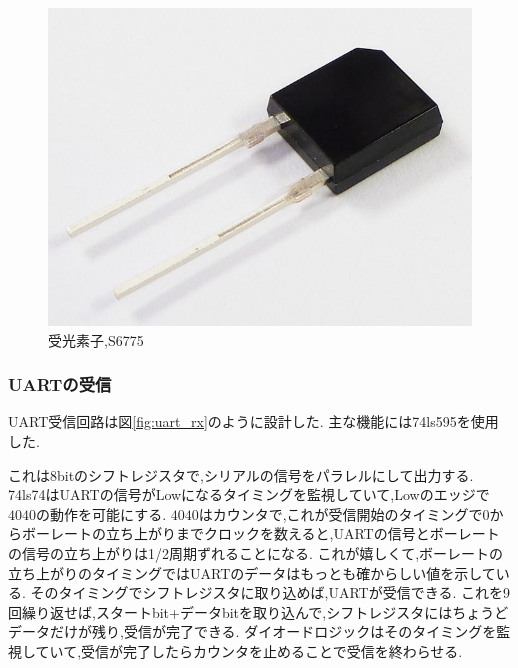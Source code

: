 \documentclass[a4paper,10pt]{article}
\begin{document}
\begin{multicols}{2}
\begin{figure}[H]
    \centering
    \includegraphics[width=\linewidth]{figure/s6775.jpg} 
    \caption{受光素子,S6775} 
    \label{fig:s6775}
\end{figure}

\subsubsection{UARTの受信}
UART受信回路は図\ref{fig:uart_rx}のように設計した.
主な機能には74ls595を使用した.

これは8bitのシフトレジスタで,シリアルの信号をパラレルにして出力する.
74ls74はUARTの信号がLowになるタイミングを監視していて,Lowのエッジで$4040$の動作を可能にする.
$4040$はカウンタで,これが受信開始のタイミングで0からボーレートの立ち上がりまでクロックを数えると,UARTの信号とボーレートの信号の立ち上がりは1/2周期ずれることになる.
これが嬉しくて,ボーレートの立ち上がりのタイミングではUARTのデータはもっとも確からしい値を示している.
そのタイミングでシフトレジスタに取り込めば,UARTが受信できる.
これを9回繰り返せば,スタートbit+データbitを取り込んで,シフトレジスタにはちょうどデータだけが残り,受信が完了できる.
ダイオードロジックはそのタイミングを監視していて,受信が完了したらカウンタを止めることで受信を終わらせる.


\end{multicols}
\end{document}
